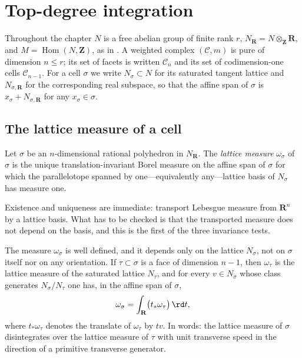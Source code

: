 \section{Top-degree integration}
\label{sec:ch11-top-degree}

Throughout the chapter $N$ is a free abelian group of finite rank $r$,
$N_{\mathbf R}=N\otimes_{\mathbf Z}\mathbf R$, and
$M=\operatorname{Hom}(N,\mathbf Z)$, as in .  A
weighted complex $(\mathscr C,m)$ is pure of dimension $n\le r$; its set of
facets is written $\mathscr C_n$ and its set of codimension-one cells
$\mathscr C_{n-1}$.  For a cell $\sigma$ we write $N_\sigma\subset N$ for its
saturated tangent lattice and $N_{\sigma,\mathbf R}$ for the corresponding
real subspace, so that the affine span of $\sigma$ is
$x_\sigma+N_{\sigma,\mathbf R}$ for any $x_\sigma\in\sigma$.

\subsection{The lattice measure of a cell}
\label{sec:ch11-lattice-measure}

\begin{definition}
\label{def:ch11-lattice-measure}
Let $\sigma$ be an $n$-dimensional rational polyhedron in $N_{\mathbf R}$.
The \emph{lattice measure} $\omega_\sigma$ of $\sigma$ is the unique
translation-invariant Borel measure on the affine span of $\sigma$ for which
the parallelotope spanned by one---equivalently any---lattice basis of
$N_\sigma$ has measure one.
\end{definition}

Existence and uniqueness are immediate: transport Lebesgue measure from
$\mathbf R^n$ by a lattice basis.  What has to be checked is that the
transported measure does not depend on the basis, and this is the first
of the three invariance tests.

\begin{lemma}
\label{lem:ch11-lattice-measure-welldefined}
The measure $\omega_\sigma$ is well defined, and it depends only on the
lattice $N_\sigma$, not on $\sigma$ itself nor on any orientation.  If
$\tau\subset\sigma$ is a face of dimension $n-1$, then
$\omega_\tau$ is the lattice measure of the saturated lattice $N_\tau$, and
for every $v\in N_\sigma$ whose class generates $N_\sigma/N_\tau$ one has,
in the affine span of $\sigma$,
\[
 \omega_\sigma
 =\int_{\mathbf R}\bigl(t_*\omega_\tau\bigr)\,\rd t,
\]
where $t_*\omega_\tau$ denotes the translate of $\omega_\tau$ by $tv$.  In
words: the lattice measure of $\sigma$ disintegrates over the lattice
measure of $\tau$ with unit transverse speed in the direction of a primitive
transverse generator.
\end{lemma}

